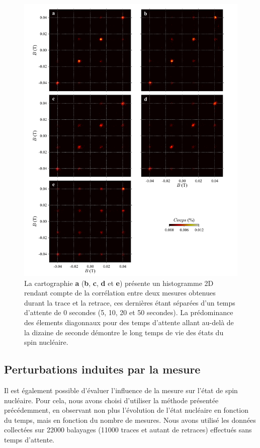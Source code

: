 \begin{figure}[h!]
\includegraphics[scale=0.45]{Resultats/HistTime/HistTime.pdf} 
\caption{La cartographie \textbf{a} (\textbf{b}, \textbf{c}, \textbf{d} et \textbf{e}) présente un histogramme 2D rendant compte de la corrélation entre deux mesures obtenues durant la trace et la retrace, ces dernières étant séparées d'un temps d'attente de 0 secondes (5, 10, 20 et 50 secondes). La prédominance des élements diagonnaux pour des temps d'attente allant au-delà de la dizaine de seconde démontre le long temps de vie des états du spin nucléaire.}
\label{evolution_temps}
\end{figure}

\subsection{Perturbations induites par la mesure}
Il est également possible d'évaluer l'influence de la mesure sur l'état de spin nucléaire. Pour cela, nous avons choisi d'utiliser la méthode présentée précédemment, en observant non plus l'évolution de l'état nucléaire en fonction du temps, mais en fonction du nombre de mesures. Nous avons utilisé les données collectées sur 22000 balayages (11000 traces et autant de retraces) effectués sans temps d'attente.

